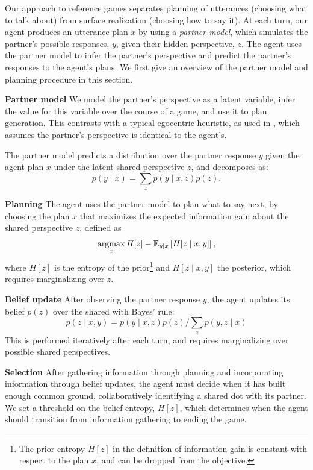 \documentclass[11pt]{article}
\newcommand{\daniel}[1]{{{\textcolor{brown}{(Daniel: #1)}}}}
\begin{document}
Our approach to reference games separates planning of utterances (choosing what to talk about) from surface realization (choosing how to say it).
At each turn, our agent produces an utterance plan $x$ by using a \emph{partner model}, which simulates the partner's possible responses, $y$, given their hidden perspective, $z$.
The agent uses the partner model to infer the partner's perspective and predict the partner's responses to the agent's plans.
We first give an overview of the partner model 
and planning procedure in this section.

\noindent \textbf{Partner model}
We model the partner's perspective as a latent variable, infer the value for this variable over the course of a game, and use it to plan generation.
This contrasts with a typical egocentric heuristic, as used in \citet{fried}, which assumes the partner's perspective
is identical to the agent's.

The partner model predicts a distribution over the partner response $y$ given the agent plan $x$ under the latent shared perspective $z$, and decomposes as:
$$p(y \mid x) = \sum_z p(y \mid x,z)p(z).$$


\noindent  \textbf{Planning}
The agent uses the partner model to plan
what to say next, by choosing
the plan $x$ that maximizes the expected information gain  \citep{lindley} about the shared perspective $z$,
defined as
$$\operatorname*{argmax}_x H[z] - \mathbb{E}_{y \mid x}\left[H[z \mid x,y]\right],$$
where $H[z]$ is the entropy of the prior\footnote{The prior entropy $H[z]$ in the definition of information gain is constant with respect to
the plan $x$, and can be dropped from the objective.}
 and $H[z\mid x,y]$ the posterior,
which requires marginalizing over $z$.


\noindent \textbf{Belief update}
After observing the partner response $y$, the agent updates its belief $p(z)$ over the shared
with Bayes' rule:
$$p(z \mid x, y) = p(y \mid x,z)p(z) / \sum_z p(y,z \mid x)$$
This is performed iteratively after each turn,
and requires marginalizing over possible shared perspectives.

\noindent \textbf{Selection}
After gathering information through planning and
incorporating information through belief updates,
the agent must decide when it has built enough common ground, collaboratively identifying a shared dot with its partner.
We set a threshold on the belief entropy, $H[z]$,
which determines when the agent should transition
from information gathering to ending the game.
\end{document}
